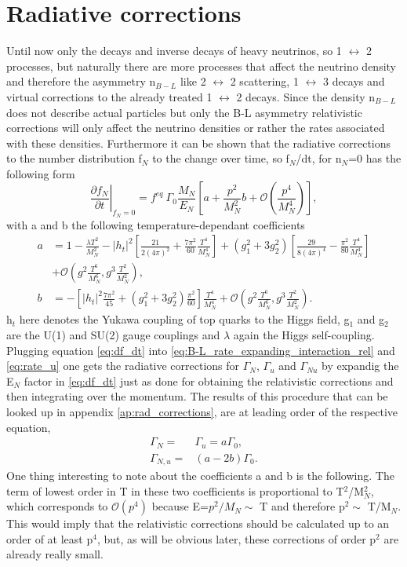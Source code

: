 \section{Radiative corrections}
Until now only the decays and inverse decays of heavy neutrinos, so 1 $\leftrightarrow$ 2 processes, but naturally there are more processes that affect the neutrino density and therefore the asymmetry n$_{B-L}$ like 2 $\leftrightarrow$ 2 scattering, 1 $\leftrightarrow$ 3 decays and virtual corrections to the already treated 1 $\leftrightarrow$ 2 decays. \newline
Since the density n$_{B-L}$ does not describe actual particles but only the B-L asymmetry relativistic corrections will only affect the neutrino densities or rather the rates associated with these densities. Furthermore it can be shown that the radiative corrections to the number distribution f$_N$ to the change over time, so f$_N$/dt, for n$_N$=0 has the following form \cite{Laine:2011pq}
\begin{equation}
\left.\frac{\partial f_N}{\partial t}\right|_{f_N=0}=f^{eq}\:\Gamma_0\frac{M_N}{E_N}\left[a+\frac{p^2}{M_N^2}b+\mathcal{O}\left(\frac{p^4}{M_N^4}\right)\right],
\label{eq:df_dt}
\end{equation}
with a and b the following temperature-dependant coefficients
\begin{align}
a&=1-\frac{\lambda T^2}{M_N^2}-\left|h_t\right|^2\left[\frac{21}{2(4\pi)^2}+\frac{7\pi^2}{60}\frac{T^4}{M_N^4}\right]+\left(g_1^2+3g_2^2\right)\left[\frac{29}{8\left(4\pi\right)^4}-\frac{\pi^2}{80}\frac{T^4}{M_N^4}\right]\\
\nonumber
&+\mathcal{O}\left(g^2\frac{T^6}{M_N^6},g^3\frac{T^2}{M_N^2}\right),\\
b&=-\left[\left|h_t\right|^2\frac{7\pi^2}{45}+\left(g_1^2+3g_2^2\right)\frac{\pi^2}{60}\right]\frac{T^4}{M_N^4}+\mathcal{O}\left(g^2\frac{T^6}{M_N^6},g^3\frac{T^2}{M_N^2}\right).
\end{align}
h$_t$ here denotes the Yukawa coupling of top quarks to the Higgs field, g$_1$ and g$_2$ are the U(1) and SU(2) gauge couplings and $\lambda$ again the Higgs self-coupling. \newline
Plugging equation \eqref{eq:df_dt} into \eqref{eq:B-L_rate_expanding_interaction_rel} and \eqref{eq:rate_u} one gets the radiative corrections for $\Gamma_N$, $\Gamma_u$ and $\Gamma_{Nu}$ by expandig the E$_N$ factor in \eqref{eq:df_dt} just as done for obtaining the relativistic corrections and then integrating over the momentum. The results of this procedure that can be looked up in appendix \ref{ap:rad_corrections}, are at leading order of the respective equation,
\begin{align}
	\Gamma_N=&\Gamma_u=a\Gamma_0,\\
	\Gamma_{N,u}=&(a-2b)\Gamma_0.
\end{align}
One thing interesting to note about the coefficients a and b is the following. The term of lowest order in T in these two coefficients is proportional to T$^2$/M$_N^2$, which corresponds to $\mathcal{O}(p^4)$ because E=$p^2/M_N\sim$ T and therefore p$^2\sim$ T/M$_N$. This would imply that the relativistic corrections should be calculated up to an order of at least p$^4$, but, as will be obvious later, these corrections of order p$^2$ are already really small.
